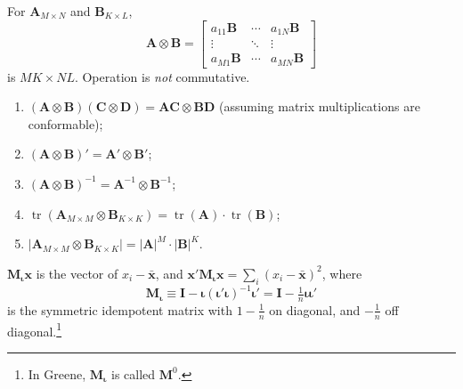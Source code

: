 \documentclass[8pt,letterpaper, landscape]{extarticle} %
\newcommand{\mA}{\ensuremath{\mathbf{A}}}
\newcommand{\mB}{\ensuremath{\mathbf{B}}}
\newcommand{\mC}{\ensuremath{\mathbf{C}}}
\newcommand{\mD}{\ensuremath{\mathbf{D}}}
\newcommand{\mx}{\ensuremath{\mathbf{x}}}
\newcommand{\mI}{\ensuremath{\mathbf{I}}}
\newcommand{\mi}{\ensuremath{\mathbf{\iota}}}
\begin{document}
\begin{multicols}{3}
\begin{description}
 For $ \mA_{M \times N} $ and $ \mB_{K \times L} $,
$$ \mA \otimes \mB = \begin{bmatrix}
a_{11} \mB & \cdots & a_{1N} \mB \\ 
\vdots & \ddots & \vdots \\
a_{M1} \mB & \cdots & a_{MN} \mB
\end{bmatrix} $$
is $ MK \times NL $. Operation is \textit{not} commutative.
\begin{enumerate}
\item $ (\mA \otimes \mB) (\mC \otimes \mD) = \mA \mC \otimes \mB \mD $ (assuming matrix multiplications are conformable);
\item $ (\mA \otimes \mB)' = \mA' \otimes \mB' $;
\item $ (\mA \otimes \mB)^{-1} = \mA^{-1} \otimes \mB^{-1} $;
\item $ \operatorname{tr} (\mA_{M \times M} \otimes \mB_{K \times K}) = \operatorname{tr} (\mA) \cdot \operatorname{tr} (\mB) $;
\item $ \lvert \mA_{M \times M} \otimes \mB_{K \times K} \rvert = \lvert \mA \rvert^{M} \cdot \lvert \mB \rvert^{K} $.
\end{enumerate}

 $ \mathbf{M}_{\mi} \mx $ is the vector of $ x_i - \bar{\mx} $, and $ \mx' \mathbf{M}_{\mi} \mx = \sum_{i} (x_i - \bar{\mx})^{2} $, where
\[ \mathbf{M}_{\mi} \equiv \mI - \mi (\mi' \mi)^{-1} \mi' = \mI - \tfrac{1}{n} \mi \mi' \]
is the symmetric idempotent matrix with $ 1 - \tfrac{1}{n} $ on diagonal, and $ - \tfrac{1}{n} $ off diagonal.\footnote{In Greene, $ \mathbf{M}_{\mi} $ is called $ \mathbf{M}^0 $.}
\end{description}
\end{multicols}
\end{document}
